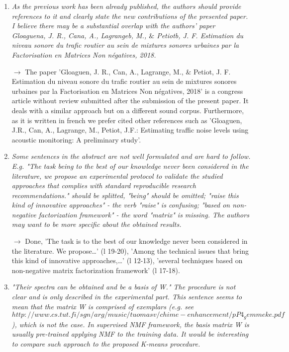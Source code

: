 \documentclass[10pt]{article}
\begin{document}
\begin{enumerate}
\item \emph{As the previous work has been already published, the authors should provide references to it and clearly state the new contributions of the presented paper. I believe there may be a substantial overlap with the authors' paper Gloaguena, J. R., Cana, A., Lagrangeb, M., $\&$ Petiotb, J. F. Estimation du niveau sonore du trafic routier au sein de mixtures sonores urbaines par la Factorisation en Matrices Non négatives, 2018.}

$\rightarrow$ The paper 'Gloaguen, J. R., Can, A., Lagrange, M., $\&$ Petiot, J. F. Estimation du niveau sonore du trafic routier au sein de mixtures sonores urbaines par la Factorisation en Matrices Non négatives, 2018' is a congress article without review submitted after the submission of the present paper. It deals with a similar approach but on a different sound corpus.  Furthermore, as it is written in french we prefer cited other references such as 'Gloaguen, J.R., Can, A., Lagrange, M., Petiot, J.F.: Estimating traffic noise levels using acoustic monitoring: A preliminary study'.


\item \emph{Some sentences in the abstract are not well formulated and are hard to follow. E.g. "The task being to the best of our knowledge never been considered in the literature, we propose an experimental protocol to validate the studied approaches that complies with standard reproducible research recommendations." should be splitted, "being" should be omitted; "raise this kind of innovative approaches" - the verb "raise" is confusing; "based on non-negative factorization framework" - the word "matrix" is missing. The authors may want to be more specific about the obtained results.}

$\rightarrow$ Done, 'The task is to the best of our knowledge never been considered in the literature. We propose\dots' (l 19-20), 'Among the technical issues that bring this kind of innovative approaches,\dots ' (l 12-13), 'several techniques based on non-negative matrix  factorization framework' (l 17-18).

\item \emph{"Their spectra can be obtained and be a basis of W." The procedure is not clear and is only described in the experimental part. This sentence seems to mean that the matrix W is comprised of exemplars (e.g. see $http://www.cs.tut.fi/sgn/arg/music/tuomasv/chime-enhancement/pP4_gemmeke.pdf$), which is not the case. In supervised NMF framework, the basis matrix W is usually pre-trained applying NMF to the training data. It would be interesting to compare such approach to the proposed K-means procedure.}


\end{enumerate}
\end{document}
